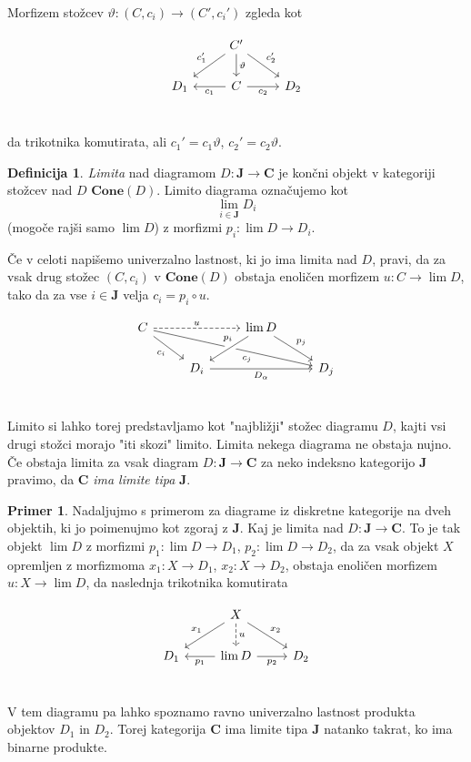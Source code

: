 \documentclass[12pt,a4paper]{book}
\theoremstyle{definition}
\newtheorem{definicija}{Definicija}[chapter]
\theoremstyle{plain}
\theoremstyle{definition}
\newtheorem{primer}{Primer}[section]
\theoremstyle{remark}
\newcommand{\cat}[1]{\textbf{#1}}
\begin{document}
Morfizem stožcev $\vartheta : (C,c_i) \to (C', c_i')$ zgleda kot 

$$\begin{tikzcd}
& C' \ar[dl, "c_1'"'] \ar[d, "\vartheta"] \ar[dr, "c_2'"] & \\
D_1 & C \ar[l, "c_1"] \ar[r, "c_2"'] & D_2 \\
\end{tikzcd}$$

da trikotnika komutirata, ali $c_1' = c_1\vartheta$, $c_2' = c_2\vartheta$.

\begin{definicija}
\textit{Limita} nad diagramom $D : \cat{J} \to \cat{C}$ je končni objekt v kategoriji stožcev nad $D$ $\cat{Cone}(D)$. Limito diagrama označujemo kot
$$\lim_{i \in \cat{J}}D_i$$
(mogoče rajši samo $\lim D$)
z morfizmi $p_i : \lim D \to D_i$.


Če v celoti napišemo univerzalno lastnost, ki jo ima limita nad $D$, pravi, da za vsak drug stožec $(C,c_i)$ v $\cat{Cone}(D)$ obstaja enoličen morfizem $u : C \to \lim D$, tako da za vse $i \in \cat{J}$ velja $c_i = p_i \circ u$.

$$\begin{tikzcd}
C \ar[rr, dashed, "u"] \ar[drrr, pos=7/11, "c_j"'] \ar[dr, "c_i"'] & & \lim D \ar[dl, crossing over, pos=1/3, "p_i"'] \ar[dr, "p_j"] \\
& D_i \ar[rr, "D_\alpha"'] & & D_j \\
\end{tikzcd}$$
\end{definicija}

Limito si lahko torej predstavljamo kot "najbližji" stožec diagramu $D$, kajti vsi drugi stožci morajo "iti skozi" limito. Limita nekega diagrama ne obstaja nujno. Če obstaja limita za vsak diagram $D : \cat{J} \to \cat{C}$ za neko indeksno kategorijo $\cat{J}$ pravimo, da $\cat{C}$ \textit{ima limite tipa} $\cat{J}$.

\begin{primer}
Nadaljujmo s primerom za diagrame iz diskretne kategorije na dveh objektih, ki jo poimenujmo kot zgoraj z $\cat{J}$. Kaj je limita nad $D : \cat{J} \to \cat{C}$. To je tak objekt $\lim D$ z morfizmi $p_1 : \lim D \to D_1$, $p_2 : \lim D \to D_2$, da za vsak objekt $X$ opremljen z morfizmoma $x_1 : X \to D_1$, $x_2 : X \to D_2$, obstaja enoličen morfizem $u : X \to \lim D$, da naslednja trikotnika komutirata 

$$\begin{tikzcd}
& X \ar[dl, "x_1"'] \ar[d, dashed, "u"] \ar[dr, "x_2"] & \\
D_1 & \lim D \ar[l, "p_1"] \ar[r, "p_2"'] & D_2 \\
\end{tikzcd}$$

V tem diagramu pa lahko spoznamo ravno univerzalno lastnost produkta objektov $D_1$ in $D_2$. Torej kategorija $\cat{C}$ ima limite tipa $\cat{J}$ natanko takrat, ko ima binarne produkte.

\end{primer}
\end{document}
